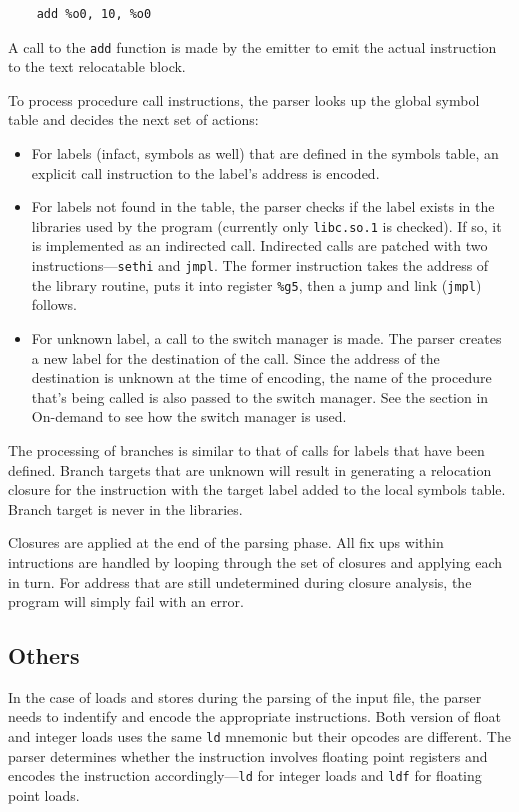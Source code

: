 \begin{verbatim}
	add %o0, 10, %o0 
\end{verbatim}

A call to the \texttt{add} function is made by the emitter to emit the
actual instruction to the text relocatable block. 

To process procedure call instructions, the parser looks up the global
symbol table and decides the next set of actions:  \begin{itemize} \item
For labels (infact, symbols as well) that are defined in the symbols
table, an explicit call instruction to the label's address is encoded. 
\item For labels not found in the table, the parser checks if the label
	exists in the libraries used by the program (currently only
	\texttt{libc.so.1} is checked). 
	If so, it is implemented as an indirected call.  Indirected calls
	are patched with two instructions---\texttt{sethi} and
\texttt{jmpl}. 
	The former instruction takes the address of the library routine,
	puts it into register \texttt{\%g5}, then a jump and link
(\texttt{jmpl})
	follows.  \item For unknown label, a call to the switch manager is
made.  The parser creates a new label for the destination of the call. 
Since the address of the destination is unknown at the time of encoding,
the
	name of the procedure that's being called is also passed to the
	switch manager. 
	See the section in On-demand to see how the switch manager is
used. \end{itemize}

The processing of branches is similar to that of calls for labels that
have been defined.  Branch targets that are unknown will result in
generating a relocation closure for the instruction with the target label
added to the local symbols table.  Branch target is never in the
libraries.

Closures are applied at the end of the parsing phase.  All fix ups within
intructions are handled by looping through the set of closures and
applying each in turn.  For address that are still undetermined during
closure analysis, the program will simply fail with an error.


\subsection{Others} In the case of loads and stores during the parsing of
the input file, the parser needs to indentify and encode the appropriate
instructions. Both version of float and integer loads uses the same
\texttt{ld} mnemonic but their opcodes are different.  The parser
determines whether the instruction involves floating point registers and
encodes the instruction accordingly---\texttt{ld} for integer loads and
\texttt{ldf} for floating point loads.


